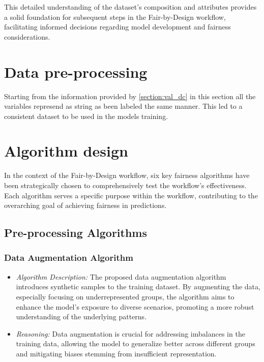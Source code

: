 This detailed understanding of the dataset's composition and attributes provides a solid foundation for subsequent steps in the Fair-by-Design workflow, facilitating informed decisions regarding model development and fairness considerations.
\section{Data pre-processing}

Starting from the information provided by \cref{section:val_dc} in this section all the variables represend as string as been labeled the same manner. This led to a consistent dataset to be used in the models training.

\section{Algorithm design}
\label{section:val_alg}

In the context of the Fair-by-Design workflow, six key fairness algorithms have been strategically chosen to comprehensively test the workflow's effectiveness. Each algorithm serves a specific purpose within the workflow, contributing to the overarching goal of achieving fairness in predictions.

\subsection{Pre-processing Algorithms}

\subsubsection{Data Augmentation Algorithm}

\begin{itemize}

    \item \emph{Algorithm Description:} The proposed data augmentation algorithm introduces synthetic samples to the training dataset. By augmenting the data, especially focusing on underrepresented groups, the algorithm aims to enhance the model's exposure to diverse scenarios, promoting a more robust understanding of the underlying patterns.

    \item \emph{Reasoning:} Data augmentation is crucial for addressing imbalances in the training data, allowing the model to generalize better across different groups and mitigating biases stemming from insufficient representation.

\end{itemize}

